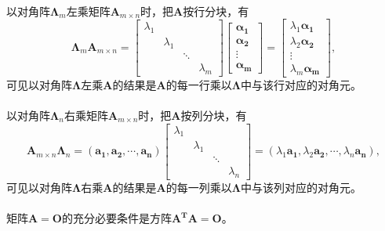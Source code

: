 \paragraph{}
以对角阵$\bm{\Lambda}_m$左乘矩阵$\bm{A}_{m\times n}$时，把$\bm{A}$按行分块，有
\begin{equation*}
  \bm{\Lambda}_m\bm{A}_{m\times n} = \left[\begin{array}{cccc}
    \lambda_1 & & & \\
    & \lambda_1 & & \\
    & & \ddots & \\
    & & & \lambda_m
  \end{array}\right]\left[\begin{array}{c}
    \bm{\alpha_1} \\
    \bm{\alpha_2} \\
    \vdots \\
    \bm{\alpha_m}
  \end{array}\right] = \left[\begin{array}{c}
    \lambda_1\bm{\alpha_1} \\
    \lambda_2\bm{\alpha_2} \\
    \vdots \\
    \lambda_m\bm{\alpha_m}
  \end{array}\right],
\end{equation*}
可见以对角阵$\bm{\Lambda}$左乘$\bm{A}$的结果是$\bm{A}$的每一行乘以$\bm{\Lambda}$中与该行对应的对角元。

\paragraph{}
以对角阵$\bm{\Lambda}_n$右乘矩阵$\bm{A}_{m\times n}$时，把$\bm{A}$按列分块，有
\begin{equation*}
  \bm{A}_{m\times n}\bm{\Lambda}_n = (\bm{a_1},\bm{a_2},\cdots,\bm{a_n})\left[\begin{array}{cccc}
    \lambda_1 & & & \\
    & \lambda_1 & & \\
    & & \ddots & \\
    & & & \lambda_n
  \end{array}\right] = (\lambda_1\bm{a_1},\lambda_2\bm{a_2},\cdots,\lambda_n\bm{a_n}),
\end{equation*}
可见以对角阵$\bm{\Lambda}$右乘$\bm{A}$的结果是$\bm{A}$的每一列乘以$\bm{\Lambda}$中与该列对应的对角元。

\paragraph{}
矩阵$\bm{A}=\bm{O}$的充分必要条件是方阵$\bm{A^TA} = \bm{O}$。

